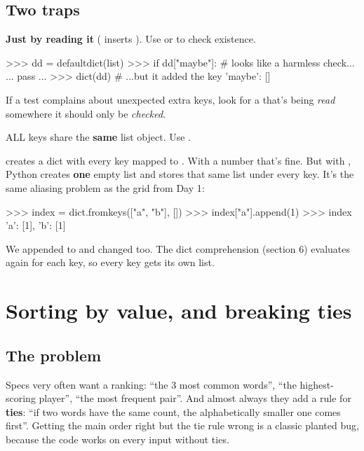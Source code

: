 \documentclass[10pt,a4paper]{article}
\begin{document}
\subsection{Two traps}
\begin{trapbox}
\textbf{Just by reading it} ( inserts \code{[]}). Use  or  to check existence.
\end{trapbox}
\begin{txtcode}
>>> dd = defaultdict(list)
>>> if dd["maybe"]:          # looks like a harmless check...
...     pass
...
>>> dict(dd)                 # ...but it added the key
{'maybe': []}
\end{txtcode}
If a test complains about unexpected extra keys, look for a  that’s being \emph{read} somewhere it should only be \emph{checked}.
\begin{trapbox}
ALL keys share the \textbf{same} list object. Use .
\end{trapbox}
 creates a dict with every key mapped to . With a number that’s fine. But with \code{[]}, Python creates \textbf{one} empty list and stores that same list under every key. It’s the same aliasing problem as the  grid from Day 1:
\begin{txtcode}
>>> index = dict.fromkeys(["a", "b"], [])
>>> index["a"].append(1)
>>> index
{'a': [1], 'b': [1]}
\end{txtcode}
We appended to  and  changed too. The dict comprehension  (section 6) evaluates \code{[]} again for each key, so every key gets its own list.
\setcounter{section}{3}
\section{Sorting by value, and breaking ties}
\subsection{The problem}
Specs very often want a ranking: “the 3 most common words”, “the highest-scoring player”, “the most frequent pair”. And almost always they add a rule for \textbf{ties}: “if two words have the same count, the alphabetically smaller one comes first”. Getting the main order right but the tie rule wrong is a classic planted bug, because the code works on every input without ties.
\end{document}

